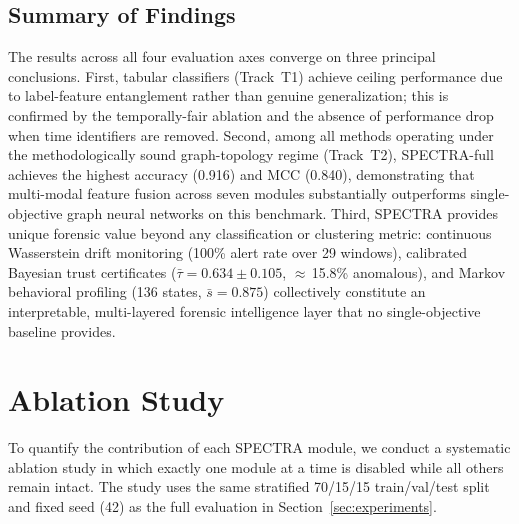 \documentclass[journal]{IEEEtran}
\begin{document}
\subsection{Summary of Findings}
\label{subsec:summary}

The results across all four evaluation axes converge on three principal
conclusions.
First, tabular classifiers (Track~T1) achieve ceiling performance due to
label-feature entanglement rather than genuine generalization; this is
confirmed by the temporally-fair ablation and the absence of performance
drop when time identifiers are removed.
Second, among all methods operating under the methodologically sound
graph-topology regime (Track~T2), SPECTRA-full achieves the highest accuracy
(\num{0.916}) and MCC (\num{0.840}), demonstrating that multi-modal feature
fusion across seven modules substantially outperforms single-objective
graph neural networks on this benchmark.
Third, SPECTRA provides unique forensic value beyond any classification or
clustering metric: continuous Wasserstein drift monitoring (100\% alert rate
over \num{29} windows), calibrated Bayesian trust certificates
($\bar{\tau} = \num{0.634} \pm \num{0.105}$, $\approx$\,15.8\% anomalous),
and Markov behavioral profiling (\num{136} states, $\bar{s} = \num{0.875}$)
collectively constitute an interpretable, multi-layered forensic intelligence
layer that no single-objective baseline provides.



\section{Ablation Study}
\label{sec:ablation}

To quantify the contribution of each SPECTRA module, we conduct a systematic
ablation study in which exactly one module at a time is disabled while all
others remain intact.
The study uses the same stratified 70/15/15 train/val/test split and fixed
seed (42) as the full evaluation in Section~\ref{sec:experiments}.
\end{document}
